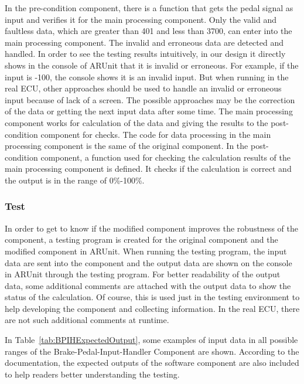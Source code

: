 In the pre-condition component, there is a function that gets the pedal signal as input and verifies it for the main processing component. Only the valid and faultless data, which are greater than 401 and less than 3700, can enter into the main processing component. The invalid and erroneous data are detected and handled. 
In order to see the testing results intuitively, in our design it directly shows in the console of ARUnit that it is invalid or erroneous. For example, if the input is -100, the console shows it is an invalid input.  But when running in the real ECU, other approaches should be used to handle an invalid or erroneous input because of lack of a screen. The possible approaches may be the correction of the data or getting the next input data after some time. The main processing component works for calculation of the data and giving the results to the post-condition component for checks. The code for data processing in the main processing component is the same of the original component. In the post-condition component, a function used for checking the calculation results of the main processing component is defined. It checks if the calculation is correct and the output is in the range of 0\%-100\%. 

\subsubsection{Test}
In order to get to know if the modified component improves the robustness of the component, a testing program is created for the original component and the modified component in ARUnit. When running the testing program, the input data are sent into the component and the output data are shown on the console in ARUnit through the testing program. For better readability of the output data, some additional comments are attached with the output data to show the status of the calculation. Of course, this is used just in the testing environment to help developing the component and collecting information. In the real ECU, there are not such additional comments at runtime. 

In Table~\ref{tab:BPIHExpectedOutput}, some examples of input data in all possible ranges of the Brake-Pedal-Input-Handler Component are shown. According to the documentation, %
the expected outputs of the software component are also included to help readers better understanding the testing. 

